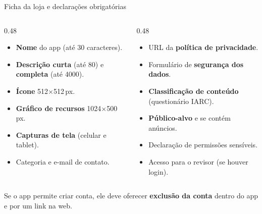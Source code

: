 \documentclass[aspectratio=169,10pt]{beamer}
\begin{document}
\begin{frame}{Ficha da loja e declarações obrigatórias}
  \begin{columns}[T]
    \begin{column}{0.48\textwidth}
      \begin{conceito}
        \begin{itemize}
          \item \textbf{Nome} do app (até 30 caracteres).
          \item \textbf{Descrição curta} (até 80) e \textbf{completa} (até 4000).
          \item \textbf{Ícone} 512$\times$512\,px.
          \item \textbf{Gráfico de recursos} 1024$\times$500\,px.
          \item \textbf{Capturas de tela} (celular e tablet).
          \item Categoria e e-mail de contato.
        \end{itemize}
      \end{conceito}
    \end{column}
    \begin{column}{0.48\textwidth}
      \begin{conceito}
        \begin{itemize}
          \item URL da \textbf{política de privacidade}.
          \item Formulário de \textbf{segurança dos dados}.
          \item \textbf{Classificação de conteúdo} (questionário IARC).
          \item \textbf{Público-alvo} e se contém anúncios.
          \item Declaração de permissões sensíveis.
          \item Acesso para o revisor (se houver login).
        \end{itemize}
      \end{conceito}
    \end{column}
  \end{columns}
  \begin{atencao}
    Se o app permite criar conta, ele deve oferecer \textbf{exclusão da conta} dentro do app e por um link na web.
  \end{atencao}
\end{frame}

\end{document}
